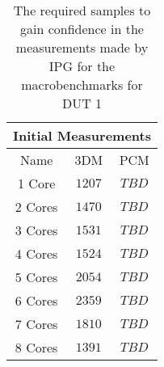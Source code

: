 \begin{table}[H]
    \centering
    \begin{tabular}{|| c | c | c ||}
    \hline
    \multicolumn{3}{||c||}{Initial Measurements} \\ [0.5ex] \hline\hline
    Name & 3DM & PCM \\\hline
    1 Core & $1207$ & $TBD$ \\
    2 Cores & $1470$ & $TBD$ \\
    3 Cores & $1531$ & $TBD$ \\
    4 Cores & $1524$ & $TBD$ \\
    5 Cores & $2054$ & $TBD$ \\
    6 Cores & $2359$ & $TBD$ \\
    7 Cores & $1810$ & $TBD$ \\
    8 Cores & $1391$ & $TBD$ \\\hline
    \end{tabular}
    \caption{The required samples to gain confidence in the measurements made by IPG for the macrobenchmarks for DUT 1}
    \label{tab:initial-measurements-exp-3-dut-1-app}
\end{table}